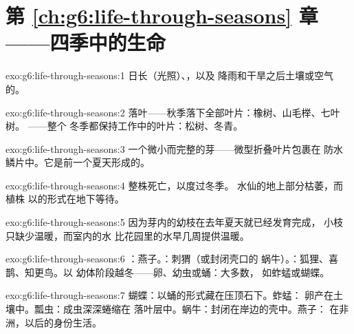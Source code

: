 \section*{第 \ref{ch:g6:life-through-seasons} 章——四季中的生命}

\begin{solution}{exo:g6:life-through-seasons:1}
日长（光照）、，以及
降雨和干旱之后土壤或空气的。
\end{solution}

\begin{solution}{exo:g6:life-through-seasons:2}
落叶——秋季落下全部叶片：橡树、山毛榉、七叶树。
——整个
冬季都保持工作中的叶片：松树、冬青。
\end{solution}

\begin{solution}{exo:g6:life-through-seasons:3}
一个微小而完整的芽——微型折叠叶片包裹在
防水鳞片中。它是前一个夏天形成的。
\end{solution}

\begin{solution}{exo:g6:life-through-seasons:4}
整株死亡，以度过冬季。
水仙的地上部分枯萎，而植株
以的形式在地下等待。
\end{solution}

\begin{solution}{exo:g6:life-through-seasons:5}
因为芽内的幼枝在去年夏天就已经发育完成，
小枝只缺少温暖，而室内的水
比花园里的水早几周提供温暖。
\end{solution}

\begin{solution}{exo:g6:life-through-seasons:6}
：燕子。：刺猬（或封闭壳口的
蜗牛）。：狐狸、喜鹊、知更鸟。以
幼体阶段越冬——卵、幼虫或蛹：大多数，
如蚱蜢或蝴蝶。
\end{solution}

\begin{solution}{exo:g6:life-through-seasons:7}
蝴蝶：以蛹的形式藏在压顶石下。蚱蜢：
卵产在土壤中。瓢虫：成虫深深蜷缩在
落叶层中。蜗牛：封闭在岸边的壳中。燕子：
在非洲，以后的身份生活。
\end{solution}


